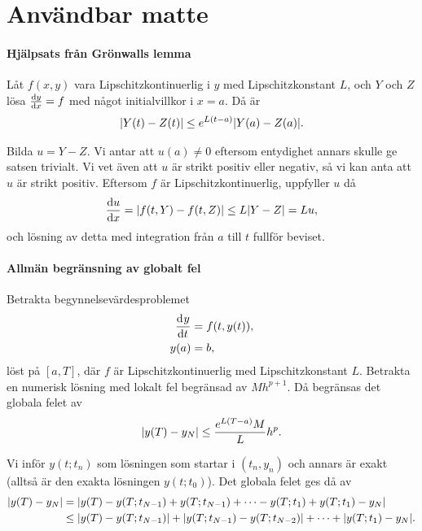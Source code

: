 \section{Användbar matte}

\paragraph{Hjälpsats från Grönwalls lemma}
Låt $f(x, y)$ vara Lipschitzkontinuerlig i $y$ med Lipschitzkonstant $L$, och $Y$ och $Z$ lösa $\dv{y}{x} = f$ med något initialvillkor i $x = a$. Då är
\begin{align*}
	\abs{Y(t) - Z(t)} \leq e^{L(t - a)}\abs{Y(a) - Z(a)}.
\end{align*}

\proof
Bilda $u = Y - Z$. Vi antar att $u(a) \neq 0$ eftersom entydighet annars skulle ge satsen trivialt. Vi vet även att $u$ är strikt positiv eller negativ, så vi kan anta att $u$ är strikt positiv. Eftersom $f$ är Lipschitzkontinuerlig, uppfyller $u$ då
\begin{align*}
	\dv{u}{x} = \abs{f(t, Y) - f(t, Z)} \leq L\abs{Y - Z} = Lu,
\end{align*}
och lösning av detta med integration från $a$ till $t$ fullför beviset.

\paragraph{Allmän begränsning av globalt fel}
Betrakta begynnelsevärdesproblemet
\begin{align*}
	\dv[]{y}{t} (t) &= f(t, y(t)), \\
	y(a)            &= b,
\end{align*}
löst på $[a, T]$, där $f$ är Lipschitzkontinuerlig med Lipschitzkonstant $L$. Betrakta en numerisk lösning med lokalt fel begränsad av $Mh^{p + 1}$. Då begränsas det globala felet av
\begin{align*}
	\abs{y(T) - y_{N}} \leq \frac{e^{L(T - a)}M}{L}h^{p}.
\end{align*}

\proof
Vi inför $y(t; t_{n})$ som lösningen som startar i $(t_{n}, y_{n})$ och annars är exakt (alltså är den exakta lösningen $y(t; t_{0})$). Det globala felet ges då av
\begin{align*}
	\abs{y(T) - y_{N}} &= \abs{y(T) - y(T; t_{N - 1}) + y(T; t_{N - 1}) + \dots - y(T; t_{1}) + y(T; t_{1}) - y_{N}} \\
	                   &\leq \abs{y(T) - y(T; t_{N - 1})} + \abs{y(T; t_{N - 1}) - y(T; t_{N - 2})} + \dots + \abs{y(T; t_{1}) - y_{N}}.
\end{align*}


